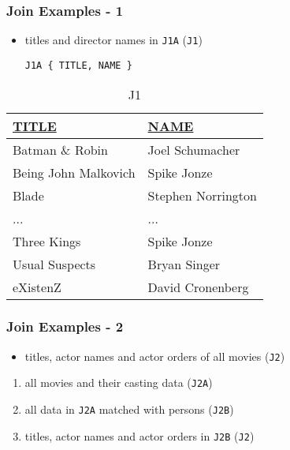 \documentclass[dvipsnames]{beamer}
\theoremstyle{plain}
\begin{document}
\begin{frame}[fragile]
  \frametitle{Join Examples - 1}

  \begin{itemize}
    \item titles and director names in \texttt{J1A}
      (\texttt{J1})
    \begin{lstlisting}
J1A { TITLE, NAME }
    \end{lstlisting}
  \end{itemize}

  \vspace{-10pt}
  \begin{tiny}
  \begin{table}
    \caption{J1}
    \begin{tabular}{|l|l|}\hline
\underline{TITLE}    & \underline{NAME}\\[2pt]\hline\hline
Batman \& Robin      & Joel Schumacher \\\hline
Being John Malkovich & Spike Jonze     \\\hline
Blade                & Stephen Norrington\\\hline
...                  & ...             \\\hline
Three Kings          & Spike Jonze     \\\hline
Usual Suspects       & Bryan Singer    \\\hline
eXistenZ             & David Cronenberg\\\hline
    \end{tabular}
  \end{table}
  \end{tiny}
\end{frame}

\begin{frame}
  \frametitle{Join Examples - 2}

  \begin{itemize}
    \item titles, actor names and actor orders of all movies (\texttt{J2})
  \end{itemize}

  \pause
  \begin{enumerate}
    \item all movies and their casting data (\texttt{J2A})

    \pause
    \item all data in \texttt{J2A} matched with persons (\texttt{J2B})

    \pause
    \item titles, actor names and actor orders in \texttt{J2B} (\texttt{J2})
  \end{enumerate}
\end{frame}
\end{document}
